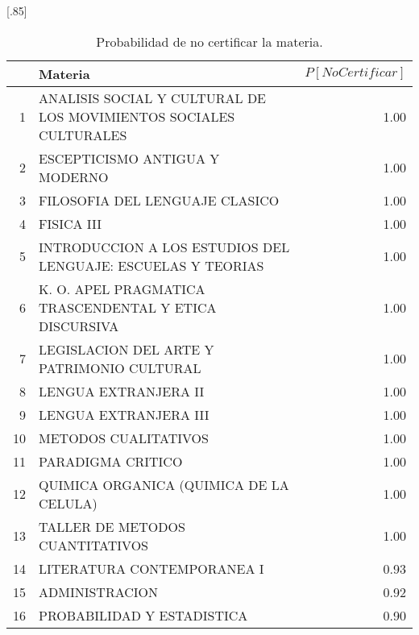 \documentclass[12pt]{article}
\begin{document}
\begin{table}[ht]
\centering
\scalebox{0.75}[.85]{
\begin{tabular}{rlr}
  \hline
 & Materia & $P[NoCertificar]$ \\ 
  \hline
1 & ANALISIS SOCIAL Y CULTURAL DE LOS MOVIMIENTOS SOCIALES CULTURALES & 1.00 \\ 
  2 & ESCEPTICISMO ANTIGUA Y MODERNO & 1.00 \\ 
  3 & FILOSOFIA DEL LENGUAJE CLASICO & 1.00 \\ 
  4 & FISICA III & 1.00 \\ 
  5 & INTRODUCCION A LOS ESTUDIOS DEL LENGUAJE: ESCUELAS Y TEORIAS & 1.00 \\ 
  6 & K. O. APEL PRAGMATICA TRASCENDENTAL Y ETICA DISCURSIVA & 1.00 \\ 
  7 & LEGISLACION DEL ARTE Y PATRIMONIO CULTURAL & 1.00 \\ 
  8 & LENGUA EXTRANJERA II & 1.00 \\ 
  9 & LENGUA EXTRANJERA III & 1.00 \\ 
  10 & METODOS CUALITATIVOS & 1.00 \\ 
  11 & PARADIGMA CRITICO & 1.00 \\ 
  12 & QUIMICA ORGANICA (QUIMICA DE LA CELULA) & 1.00 \\ 
  13 & TALLER DE METODOS CUANTITATIVOS & 1.00 \\ 
  14 & LITERATURA CONTEMPORANEA I & 0.93 \\ 
  15 & ADMINISTRACION & 0.92 \\ 
  16 & PROBABILIDAD Y ESTADISTICA & 0.90 \\ 
   \hline
\end{tabular}}
\caption{\label{Prob_No_Cert}Probabilidad de no certificar la materia.}
\end{table}
\end{document}
